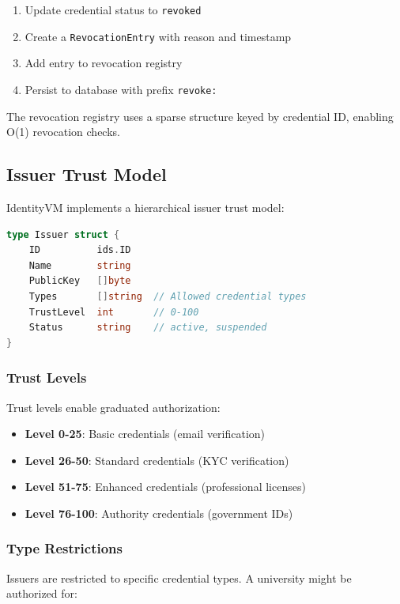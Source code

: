 \documentclass[11pt,twocolumn]{article}
\begin{document}
\begin{enumerate}
\item Update credential status to \texttt{revoked}
\item Create a \texttt{RevocationEntry} with reason and timestamp
\item Add entry to revocation registry
\item Persist to database with prefix \texttt{revoke:}
\end{enumerate}

The revocation registry uses a sparse structure keyed by credential ID, enabling O(1) revocation checks.

\subsection{Issuer Trust Model}

IdentityVM implements a hierarchical issuer trust model:

\begin{lstlisting}[language=Go,basicstyle=\ttfamily\small]
type Issuer struct {
    ID          ids.ID
    Name        string
    PublicKey   []byte
    Types       []string  // Allowed credential types
    TrustLevel  int       // 0-100
    Status      string    // active, suspended
}
\end{lstlisting}

\subsubsection{Trust Levels}

Trust levels enable graduated authorization:

\begin{itemize}
\item \textbf{Level 0-25}: Basic credentials (email verification)
\item \textbf{Level 26-50}: Standard credentials (KYC verification)
\item \textbf{Level 51-75}: Enhanced credentials (professional licenses)
\item \textbf{Level 76-100}: Authority credentials (government IDs)
\end{itemize}

\subsubsection{Type Restrictions}

Issuers are restricted to specific credential types. A university might be authorized for:
\end{document}
